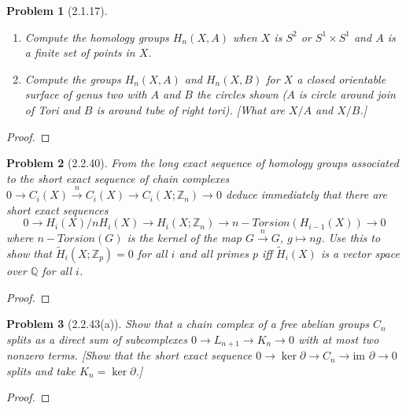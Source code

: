 \documentclass[10pt]{article}
\newcommand{\sk}{\vskip 10mm}
\newcommand{\bb}[1]{\mathbb{#1}}
\newcommand{\rH}{\widetilde{H}}
\theoremstyle{plain}
\newtheorem{problem}{Problem}
\theoremstyle{remark}
\begin{document}
\begin{problem}[2.1.17]
  \begin{enumerate}
  \item[(a)] Compute the homology groups $H_n(X,A)$ when $X$ is $S^2$ or
    $S^1\times S^1$ and $A$ is a finite set of points in $X$.
  \item[(b)] Compute the groups $H_n(X,A)$ and $H_n(X,B)$ for $X$ a
    closed orientable surface of genus two with $A$ and $B$ the circles
    shown ($A$ is circle around join of Tori and $B$ is around tube of right
    tori). [What are $X/A$ and $X/B$.]
  \end{enumerate}
\end{problem}

\begin{proof}
  
\end{proof}

\sk

\begin{problem}[2.2.40]
  From the long exact sequence of homology groups associated to the short
  exact sequence of chain complexes
  $0\rightarrow C_i(X)\xrightarrow{n} C_i(X)\rightarrow C_i(X;\bb{Z}_n)\rightarrow 0$
  deduce immediately that there are short exact sequences
  \[
    0\rightarrow H_i(X)/nH_i(X)\rightarrow H_i(X;\bb{Z}_n)\rightarrow n-Torsion(H_{i-1}(X))\rightarrow 0
  \]
  where $n-Torsion(G)$ is the kernel of the map $G\xrightarrow{n} G$,
  $g\mapsto ng$. Use this to show that $\rH_i(X;\bb{Z}_p)=0$ for all $i$ and all
  primes $p$ iff $\rH_i(X)$ is a vector space over $\bb{Q}$ for all $i$.
\end{problem}

\begin{proof}
  
\end{proof}

\sk

\begin{problem}[2.2.43(a)]
  Show that a chain complex of a free abelian groups $C_n$ splits as a
  direct sum of subcomplexes $0\rightarrow L_{n+1}\rightarrow K_n\rightarrow 0$
  with at most two nonzero terms. [Show that the short exact sequence
  $0\rightarrow\ker\partial\rightarrow C_n\rightarrow\text{im\ }\partial\rightarrow 0$
  splits and take $K_n=\ker\partial$.]
\end{problem}

\begin{proof}
  
\end{proof}
\end{document}
